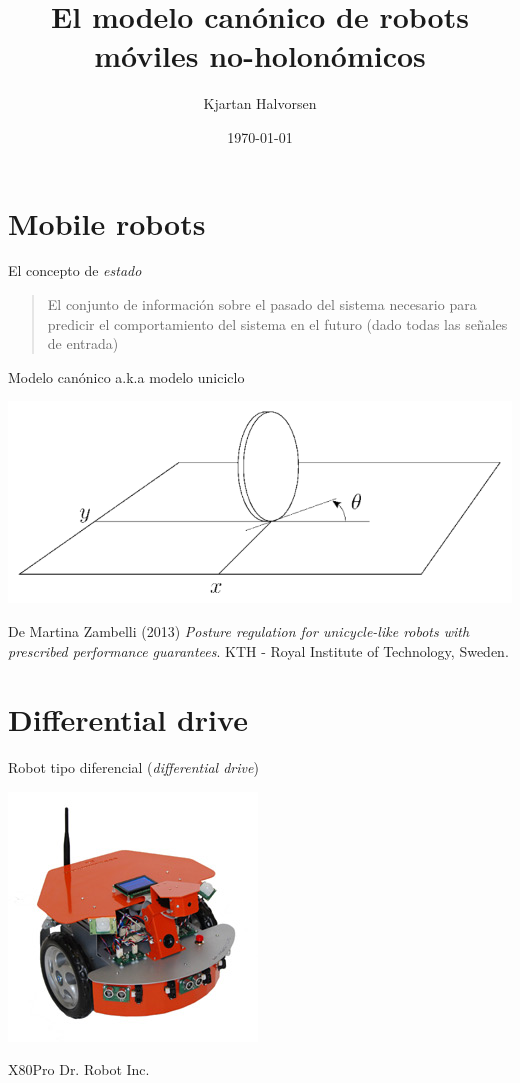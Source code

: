 \documentclass[presentation,aspectratio=169]{beamer}
\author{Kjartan Halvorsen}
\date{\today}
\title{El modelo canónico de robots móviles no-holonómicos}
\begin{document}
\maketitle

\section{Mobile robots}
\label{sec:org29e8592}

\begin{frame}[label={sec:orgb81a4f2}]{El concepto de \emph{estado}}
\pause

\begin{quote}
El conjunto de información sobre el pasado del sistema necesario para predicir el comportamiento del sistema en el futuro (dado todas las señales de entrada)
\end{quote}
\end{frame}

\begin{frame}[label={sec:orge9b96e8}]{Modelo canónico a.k.a modelo uniciclo}
\begin{center}
 \includegraphics[width=.6\linewidth]{../figures/unicycle-kth.png}
\end{center}

\footnotesize
De Martina Zambelli (2013) \emph{Posture regulation for unicycle-like robots with prescribed performance guarantees}. KTH - Royal Institute of Technology, Sweden.
\end{frame}


\section{Differential drive}
\label{sec:org7c4c6bd}

\begin{frame}[label={sec:orgfc27793}]{Robot tipo diferencial (\emph{differential drive})}
\begin{center}
 \includegraphics[width=.5\linewidth]{../figures/X80Pro.jpg}
\end{center}

X80Pro Dr. Robot Inc.
\end{frame}
\end{document}
